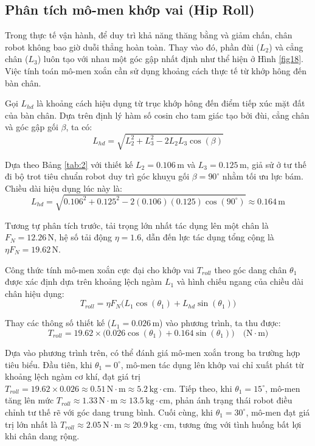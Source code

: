 \subsection{Phân tích mô-men khớp vai (Hip Roll)}

Trong thực tế vận hành, để duy trì khả năng thăng bằng và giảm chấn, chân robot không bao giờ duỗi thẳng hoàn toàn. Thay vào đó, phần đùi ($L_2$) và cẳng chân ($L_3$) luôn tạo với nhau một góc gập nhất định như thể hiện ở Hình \ref{fig18}. Việc tính toán mô-men xoắn cần sử dụng khoảng cách thực tế từ khớp hông đến bàn chân. 

Gọi $L_{hd}$ là khoảng cách hiệu dụng từ trục khớp hông đến điểm tiếp xúc mặt đất của bàn chân. Dựa trên định lý hàm số cosin cho tam giác tạo bởi đùi, cẳng chân và góc gập gối $\beta$, ta có:
\begin{equation}
    L_{hd} = \sqrt{L_2^2 + L_3^2 - 2L_2L_3\cos(\beta)}
\end{equation}

Dựa theo Bảng \ref{tab:2} với thiết kế $L_2 = 0.106\,\text{m}$ và $L_3 = 0.125\,\text{m}$, giả sử ở tư thế đi bộ trot tiêu chuẩn robot duy trì góc khuỵu gối $\beta = 90^\circ$ nhằm tối ưu lực bám. Chiều dài hiệu dụng lúc này là:
\begin{equation}
    L_{hd} = \sqrt{0.106^2 + 0.125^2 - 2(0.106)(0.125)\cos(90^\circ)} \approx 0.164\,\text{m}
\end{equation}

Tương tự phân tích trước, tải trọng lớn nhất tác dụng lên một chân là $F_N = 12.26\,\text{N}$, hệ số tải động $\eta = 1.6$, dẫn đến lực tác dụng tổng cộng là $\eta F_N = 19.62\,\text{N}$. 

Công thức tính mô-men xoắn cực đại cho khớp vai $T_{roll}$ theo góc dang chân $\theta_1$ được xác định dựa trên khoảng lệch ngàm $L_1$ và hình chiếu ngang của chiều dài chân hiệu dụng:
\begin{equation}
    T_{roll} = \eta F_N \big(L_1 \cos(\theta_1) + L_{hd} \sin(\theta_1)\big)
\end{equation}

Thay các thông số thiết kế ($L_1 = 0.026\,\text{m}$) vào phương trình, ta thu được:
\begin{equation}
    T_{roll} = 19.62 \times \big(0.026 \cos(\theta_1) + 0.164 \sin(\theta_1)\big) \quad \text{(N}\cdot\text{m)}
\end{equation}

Dựa vào phương trình trên, có thể đánh giá mô-men xoắn trong ba trường hợp tiêu biểu. Đầu tiên, khi $\theta_1 = 0^\circ$, mô-men tác dụng lên khớp vai chỉ xuất phát từ khoảng lệch ngàm cơ khí, đạt giá trị $T_{roll} = 19.62 \times 0.026 \approx 0.51\,\text{N}\cdot\text{m} \approx 5.2\,\text{kg}\cdot\text{cm}$. Tiếp theo, khi $\theta_1 = 15^\circ$, mô-men tăng lên mức $T_{roll} \approx 1.33\,\text{N}\cdot\text{m} \approx 13.5\,\text{kg}\cdot\text{cm}$, phản ánh trạng thái robot điều chỉnh tư thế rẽ với góc dang trung bình. Cuối cùng, khi $\theta_1 = 30^\circ$, mô-men đạt giá trị lớn nhất là $T_{roll} \approx 2.05\,\text{N}\cdot\text{m} \approx 20.9\,\text{kg}\cdot\text{cm}$, tương ứng với tình huống bất lợi khi chân dang rộng.

